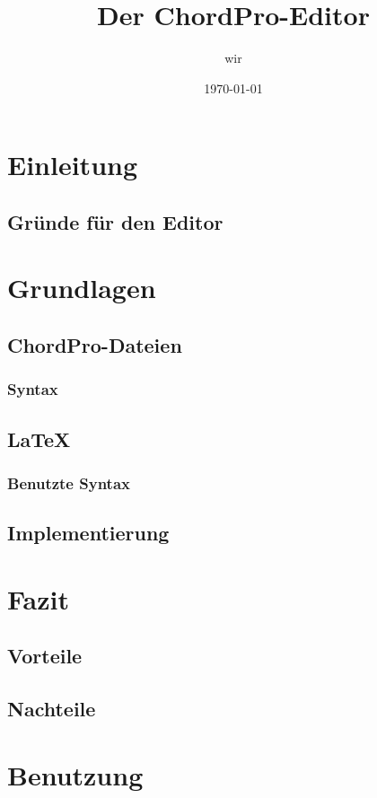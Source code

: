 \documentclass{scrbook}
\author{wir}
\title{Der ChordPro-Editor}
\date{\today}
\begin{document}
\maketitle

\tableofcontents

\chapter{Einleitung}
	\section{Gr\"unde f\"ur den Editor}

\chapter{Grundlagen}
	\section{ChordPro-Dateien}
		\subsection{Syntax}
	
	\section{LaTeX}
		\subsection{Benutzte Syntax}
		
	\section{Implementierung}
	

\chapter{Fazit}
	\section{Vorteile}
	\section{Nachteile}

\chapter{Benutzung}
\end{document}
